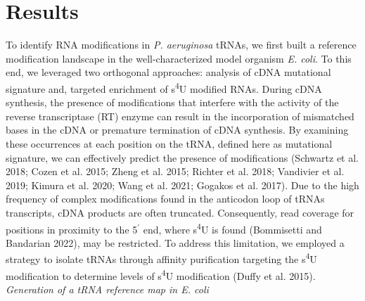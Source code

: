 \documentclass[times, twoside]{zHenriquesLab-StyleBioRxiv}
\begin{document}
\section*{Results}

To identify RNA modifications in \textit{P. aeruginosa} tRNAs, we first built a reference modification landscape in the well-characterized model organism \textit{E. coli}. To this end, we leveraged two orthogonal approaches: analysis of cDNA mutational signature and, targeted enrichment of s\textsuperscript{4}U modified RNAs. During cDNA synthesis, the presence of modifications that interfere with the activity of the reverse transcriptase (RT) enzyme can result in the incorporation of mismatched bases in the cDNA or premature termination of cDNA synthesis. By examining these occurrences at each position on the tRNA, defined here as mutational signature, we can effectively predict the presence of modifications (Schwartz et al. 2018; Cozen et al. 2015; Zheng et al. 2015; Richter et al. 2018; Vandivier et al. 2019; Kimura et al. 2020; Wang et al. 2021; Gogakos et al. 2017). Due to the high frequency of complex modifications found in the anticodon loop of tRNAs transcripts, cDNA products are often truncated. Consequently, read coverage for positions in proximity to the 5\(^{\prime}\)  end, where s\textsuperscript{4}U is found (Bommisetti and Bandarian 2022), may be restricted. To address this limitation, we employed a strategy to isolate tRNAs through affinity purification targeting the s\textsuperscript{4}U modification to determine levels of s\textsuperscript{4}U modification (Duffy et al. 2015). 
\newline
\newline
\textit{Generation of a tRNA reference map in E. coli }
\end{document}
